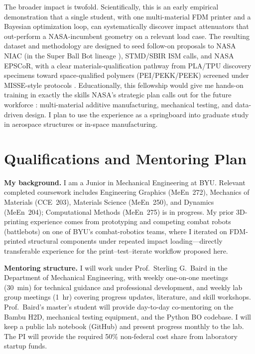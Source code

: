 \documentclass[11pt]{article}
\begin{document}
The broader impact is twofold.  Scientifically, this is an early empirical
demonstration that a single student, with one multi-material FDM printer
and a Bayesian optimization loop, can systematically discover impact
attenuators that out-perform a NASA-incumbent geometry on a relevant load
case.  The resulting dataset and methodology are designed to seed follow-on
proposals to NASA NIAC (in the Super Ball Bot lineage
\citep{agogino2018superball,deitrich2022titan}), STMD/SBIR ISM calls, and
NASA EPSCoR, with a clear materials-qualification pathway from PLA/TPU
discovery specimens toward space-qualified polymers (PEI/PEKK/PEEK) screened
under MISSE-style protocols \citep{finckenor2023misse}.  Educationally, this
fellowship would give me hands-on training in exactly the skills NASA's
strategic plan calls out for the future workforce \citep{nasa2022strategic}:
multi-material additive manufacturing, mechanical testing, and data-driven
design.  I plan to use the experience as a springboard into graduate study
in aerospace structures or in-space manufacturing.

\section{Qualifications and Mentoring Plan}

\textbf{My background.} I am a Junior in Mechanical Engineering at BYU.
Relevant completed coursework includes Engineering Graphics (MeEn~272),
Mechanics of Materials (CCE~203), Materials Science (MeEn~250), and
Dynamics (MeEn~204); Computational Methods (MeEn~275) is in progress.  My
prior 3D-printing experience comes from prototyping and competing combat
robots (battlebots) on one of BYU's combat-robotics teams, where I iterated
on FDM-printed structural components under repeated impact loading---directly
transferable experience for the print--test--iterate workflow proposed here.

\textbf{Mentoring structure.} I will work under Prof.~Sterling G.~Baird in the
Department of Mechanical Engineering, with weekly one-on-one meetings
(30~min) for technical guidance and professional development, and weekly lab
group meetings (1~hr) covering progress updates, literature, and skill
workshops.  Prof.~Baird's master's student will provide day-to-day co-mentoring
on the Bambu H2D, mechanical testing equipment, and the Python BO codebase.
I will keep a public lab notebook (GitHub) and present progress monthly to
the lab.  The PI will provide the required 50\% non-federal cost share from
laboratory startup funds.

{\footnotesize
\setlength{\bibsep}{0pt plus 0.3ex}


}
\end{document}

